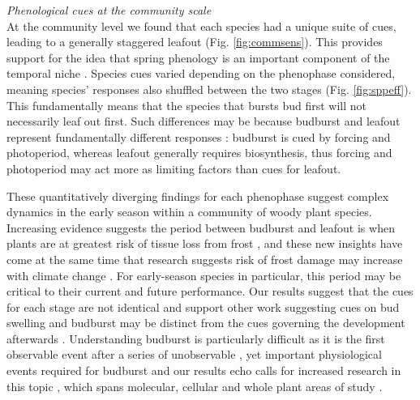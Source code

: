 \documentclass[11pt]{article}
\begin{document}
\noindent \emph{Phenological cues at the community scale}\\
\noindent At the community level we found that each species had a unique suite of cues, leading to a generally staggered leafout (Fig. \ref{fig:commsens}). This provides support for the idea that spring phenology is an important component of the temporal niche \citep{gotelli1996,Loreau:2008xy}. Species cues varied depending on the phenophase considered, meaning species' responses also shuffled between the two stages (Fig. \ref{fig:sppeff}). This fundamentally means that the species that bursts bud first will not necessarily leaf out first. Such differences may be because budburst and leafout represent fundamentally different responses \citep{Basler:2014aa}: budburst is cued by forcing and photoperiod, whereas leafout generally requires biosynthesis, thus forcing and photoperiod may act more as limiting factors than cues for leafout. 

These quantitatively diverging findings for each phenophase suggest complex dynamics in the early season within a community of woody plant species. Increasing evidence suggests the period between budburst and leafout is when plants are at greatest risk of tissue loss from frost \citep{Lenz:2013aa}, and these new insights have come at the same time that research suggests risk of frost damage may increase with climate change \citep{Augspurger:2009gj,Dai2013}. For early-season species in particular, this period may be critical to their current and future performance. Our results suggest that the cues for each stage are not identical and support other work suggesting cues on bud swelling and budburst may be distinct from the cues governing the development afterwards \citep{Basler:2014aa}. Understanding budburst is particularly difficult as it is the first observable event after a series of unobservable \citep[but see][]{rinne2011}, yet important physiological events required for budburst \citep{Caffarra:2011aa,vitasse2014rev} and our results echo calls for increased research in this topic \citep{chuine2016}, which spans molecular, cellular and whole plant areas of study \citep{Morin:2009,rinne2011,singh2017}. 
\end{document}

